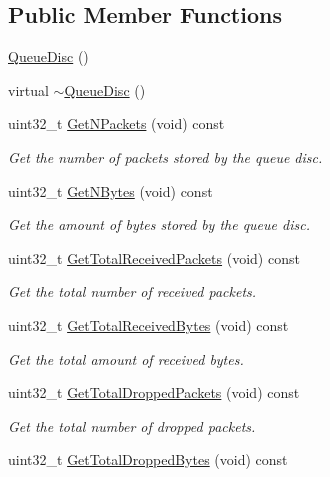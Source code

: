 \subsection*{Public Member Functions}
\begin{DoxyCompactItemize}
\item 
\hyperlink{classns3_1_1QueueDisc_a0e328ad3196b7d16783b8680722381d6}{Queue\+Disc} ()
\item 
virtual \hyperlink{classns3_1_1QueueDisc_a13e58692c0f31d303091b022cb73c216}{$\sim$\+Queue\+Disc} ()
\item 
uint32\+\_\+t \hyperlink{classns3_1_1QueueDisc_a6ee992f32c1671512f0948fd6cc46a7e}{Get\+N\+Packets} (void) const 
\begin{DoxyCompactList}\small\item\em Get the number of packets stored by the queue disc. \end{DoxyCompactList}\item 
uint32\+\_\+t \hyperlink{classns3_1_1QueueDisc_ac87d3bbf7381d64808f6764bdfd812e5}{Get\+N\+Bytes} (void) const 
\begin{DoxyCompactList}\small\item\em Get the amount of bytes stored by the queue disc. \end{DoxyCompactList}\item 
uint32\+\_\+t \hyperlink{classns3_1_1QueueDisc_ae28596b0b2ad428a9140726b0a0943c7}{Get\+Total\+Received\+Packets} (void) const 
\begin{DoxyCompactList}\small\item\em Get the total number of received packets. \end{DoxyCompactList}\item 
uint32\+\_\+t \hyperlink{classns3_1_1QueueDisc_a954d8df1c4519c41a35e5f7c805a2141}{Get\+Total\+Received\+Bytes} (void) const 
\begin{DoxyCompactList}\small\item\em Get the total amount of received bytes. \end{DoxyCompactList}\item 
uint32\+\_\+t \hyperlink{classns3_1_1QueueDisc_a0ec6ad7777a361db9a1a609bede088a9}{Get\+Total\+Dropped\+Packets} (void) const 
\begin{DoxyCompactList}\small\item\em Get the total number of dropped packets. \end{DoxyCompactList}\item 
uint32\+\_\+t \hyperlink{classns3_1_1QueueDisc_adea5022bc83cb149d66b667edfe85745}{Get\+Total\+Dropped\+Bytes} (void) const 

\end{DoxyCompactItemize}

